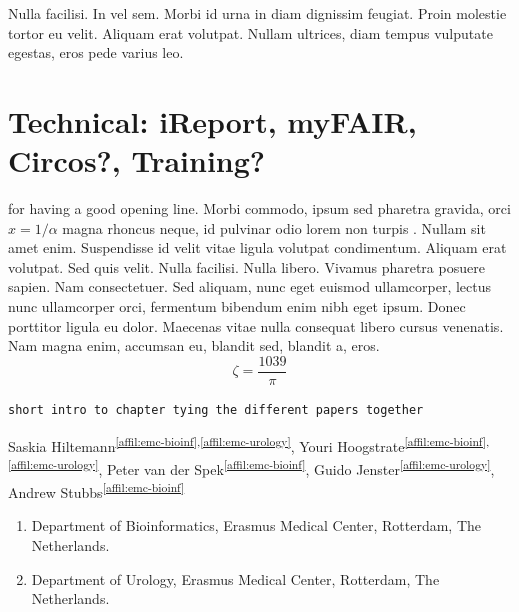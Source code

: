 \begin{savequote}[75mm]
Nulla facilisi. In vel sem. Morbi id urna in diam dignissim feugiat. Proin molestie tortor eu velit. Aliquam erat volutpat. Nullam ultrices, diam tempus vulputate egestas, eros pede varius leo.
\end{savequote}

\chapter{Technical: iReport, myFAIR, Circos?, Training?}
\setcounter{figure}{-1}
\setcounter{table}{-1}
\setcounter{section}{-1}
\setcounter{NAT@ctr}{-1}

 for having a good opening line. Morbi commodo, ipsum sed pharetra gravida, orci  $x = 1/\alpha$ magna rhoncus neque, id pulvinar odio lorem non turpis \cite{Eigen1971, Knuth1968}. Nullam sit amet enim. Suspendisse id velit vitae ligula volutpat condimentum. Aliquam erat volutpat. Sed quis velit. Nulla facilisi. Nulla libero. Vivamus pharetra posuere sapien. Nam consectetuer. Sed aliquam, nunc eget euismod ullamcorper, lectus nunc ullamcorper orci, fermentum bibendum enim nibh eget ipsum. Donec porttitor ligula eu dolor. Maecenas vitae nulla consequat libero cursus venenatis. Nam magna enim, accumsan eu, blandit sed, blandit a, eros.
$$\zeta = \frac{1039}{\pi}$$

\verb+short intro to chapter tying the different papers together +

\newpage


Saskia Hiltemann\textsuperscript{\ref{affil:emc-bioinf},\ref{affil:emc-urology}},
Youri Hoogstrate\textsuperscript{\ref{affil:emc-bioinf},\ref{affil:emc-urology}},
Peter van der Spek\textsuperscript{\ref{affil:emc-bioinf}},
Guido Jenster\textsuperscript{\ref{affil:emc-urology}},
Andrew Stubbs\textsuperscript{\ref{affil:emc-bioinf}}

\small
\begin{enumerate}
\itemsep-0.5em
\item Department of Bioinformatics, Erasmus Medical Center, Rotterdam, The Netherlands. \label{affil:emc-bioinf}
\item Department of Urology, Erasmus Medical Center, Rotterdam, The Netherlands. \label{affil:emc-urology}
\end{enumerate}
\normalsize


